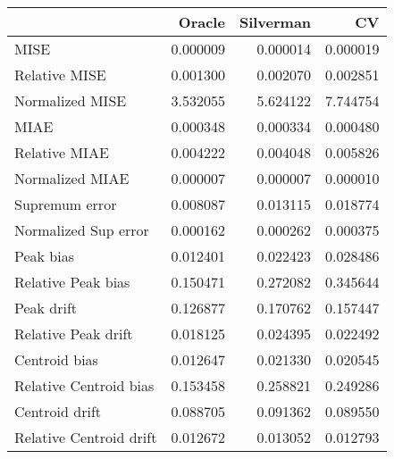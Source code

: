\begin{tabular}{lrrr}
  \toprule
 & Oracle & Silverman & CV \\ 
  \midrule
MISE & 0.000009 & 0.000014 & 0.000019 \\ 
  Relative MISE & 0.001300 & 0.002070 & 0.002851 \\ 
  Normalized MISE & 3.532055 & 5.624122 & 7.744754 \\ 
  MIAE & 0.000348 & 0.000334 & 0.000480 \\ 
  Relative MIAE & 0.004222 & 0.004048 & 0.005826 \\ 
  Normalized MIAE & 0.000007 & 0.000007 & 0.000010 \\ 
  Supremum error & 0.008087 & 0.013115 & 0.018774 \\ 
  Normalized Sup error & 0.000162 & 0.000262 & 0.000375 \\ 
  Peak bias & 0.012401 & 0.022423 & 0.028486 \\ 
  Relative Peak bias & 0.150471 & 0.272082 & 0.345644 \\ 
  Peak drift & 0.126877 & 0.170762 & 0.157447 \\ 
  Relative Peak drift & 0.018125 & 0.024395 & 0.022492 \\ 
  Centroid bias & 0.012647 & 0.021330 & 0.020545 \\ 
  Relative Centroid bias & 0.153458 & 0.258821 & 0.249286 \\ 
  Centroid drift & 0.088705 & 0.091362 & 0.089550 \\ 
  Relative Centroid drift & 0.012672 & 0.013052 & 0.012793 \\ 
   \bottomrule
\end{tabular}
